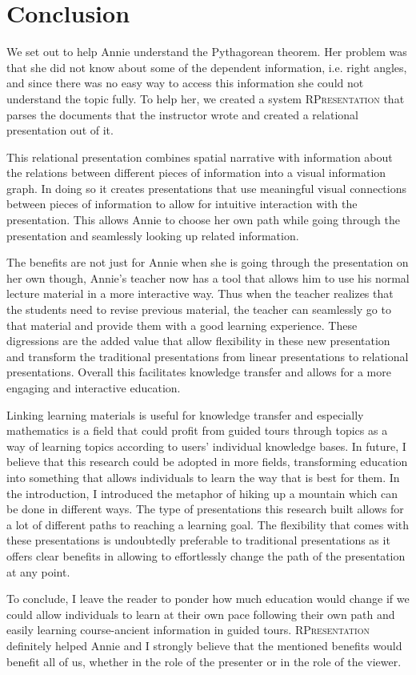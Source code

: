 \documentclass{llncs}
\newcommand{\sys}{\textsc{RPresentation}\xspace}
\begin{document}
\section{Conclusion}
\label{sec:conclusion}

We set out to help Annie understand the Pythagorean theorem. Her problem was that she did not know about some of the dependent information, i.e. right angles, and since there was no easy way to access this information she could not understand the topic fully. To help her, we created a system \sys that parses the documents that the instructor wrote and created a relational presentation out of it.

This relational presentation combines spatial narrative with information about the relations between different pieces of information into a visual information graph. In doing so it creates presentations that use meaningful visual connections between pieces of information to allow for intuitive interaction with the presentation. This allows Annie to choose her own path while going through the presentation and seamlessly looking up related information.

The benefits are not just for Annie when she is going through the presentation on her own though, Annie's teacher now has a tool that allows him to use his normal lecture material in a more interactive way. Thus when the teacher realizes that the students need to revise previous material, the teacher can seamlessly go to that material and provide them with a good learning experience. These digressions are the added value that allow flexibility in these new presentation and transform the traditional presentations from linear presentations to relational presentations. Overall this facilitates knowledge transfer and allows for a more engaging and interactive education.

Linking learning materials is useful for knowledge transfer and especially mathematics is a field that could profit from guided tours through topics as a way of learning topics according to users' individual knowledge bases. In future, I believe that this research could be adopted in more fields, transforming education into something that allows individuals to learn the way that is best for them. In the introduction, I introduced the metaphor of hiking up a mountain which can be done in different ways. The type of presentations this research built allows for a lot of different paths to reaching a learning goal. The flexibility that comes with these presentations is undoubtedly preferable to traditional presentations as it offers clear benefits in allowing to effortlessly change the path of the presentation at any point.

To conclude, I leave the reader to ponder how much education would change if we could allow individuals to learn at their own pace following their own path and easily learning course-ancient information in guided tours. \sys definitely helped Annie and I strongly believe that the mentioned benefits would benefit all of us, whether in the role of the presenter or in the role of the viewer.




\end{document}
